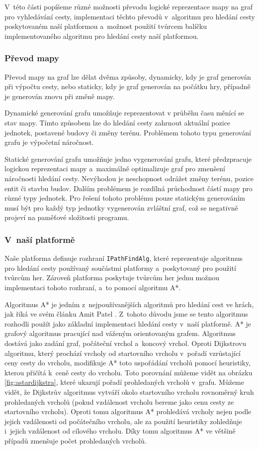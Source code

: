 V~této části popíšeme různé možnosti převodu logické reprezentace mapy na graf pro vyhledávání cesty, implementaci těchto převodů v~algoritmu pro hledání cesty poskytovaném naší platformou a~možnost použití tvůrcem balíčku implementovaného algoritmu pro hledání cesty naší platformou.


\subsubsection{Převod mapy}
Převod mapy na graf lze dělat dvěma způsoby, dynamicky, kdy je graf generován při výpočtu cesty, nebo staticky, kdy je graf generován na počátku hry, případně je generován znovu při změně mapy.

Dynamické generování grafu umožňuje reprezentovat v průběhu času měnící se stav mapy. Tímto způsobem lze do hledání cesty zahrnout aktuální pozice jednotek, postavené budovy či změny terénu. Problémem tohoto typu generování grafu je výpočetní náročnost.

Statické generování grafu umožňuje jedno vygenerování grafu, které předzpracuje logickou reprezentaci mapy a~maximálně optimalizuje graf pro zmenšení náročnosti hledání cesty. Nevýhodou je neschopnost odrážet změny terénu, pozice entit či stavbu budov. Dalším problémem je rozdílná průchodnost částí mapy pro různé typy jednotek. Pro řešení tohoto problému pouze statickým generováním musí být pro každý typ jednotky vygenerován zvláštní graf, což se negativně projeví na paměťové složitosti programu.

\subsubsection{V~naší platformě}
\label{sec:astar}
Naše platforma definuje rozhraní \texttt{IPathFindAlg}, které reprezentuje algoritmus pro hledání cesty používaný součástmi platformy a~poskytovaný pro použití tvůrcům her. Zároveň platforma poskytuje tvůrcům her jednu možnou implementaci tohoto rozhraní, a~to pomocí algoritmu A*.

Algoritmus A* je jedním z~nejpoužívanějších algoritmů pro hledání cest ve hrách, jak říká ve svém článku Amit Patel \citep{site:introastar}. Z~tohoto důvodu jsme se tento algoritmus rozhodli použít jako základní implementaci hledání cesty v~naší platformě. A* je grafový algoritmus pracující nad váženým orientovaným grafem. Algoritmus dostává jako zadání graf, počáteční vrchol a~koncový vrchol. Oproti Dijkstrovu algoritmu, který prochází vrcholy od startovního vrcholu v~pořadí vzrůstající ceny cesty do vrcholu, modifikuje A* toto uspořádání vrcholů pomocí heuristiky, kterou přičítá k~ceně cesty do vrcholu. Toto porovnání můžeme vidět na obrázku \ref{fig:astardijkstra}, které ukazují pořadí prohledaných vrcholů v~grafu. Můžeme vidět, že Dijkstrův algoritmus vytváří okolo startovního vrcholu rovnoměrný kruh prohledaných vrcholů (pokud vzdálenost vrcholu bereme jako cenu cesty ze startovního vrcholu). Oproti tomu algoritmus A* prohledává vrcholy nejen podle jejich vzdálenosti od počátečního vrcholu, ale za použití heuristiky zohledňuje i~jejich vzdálenost od cílového vrcholu. Díky tomu algoritmus A* ve většině případů zmenšuje počet prohledaných vrcholů.

